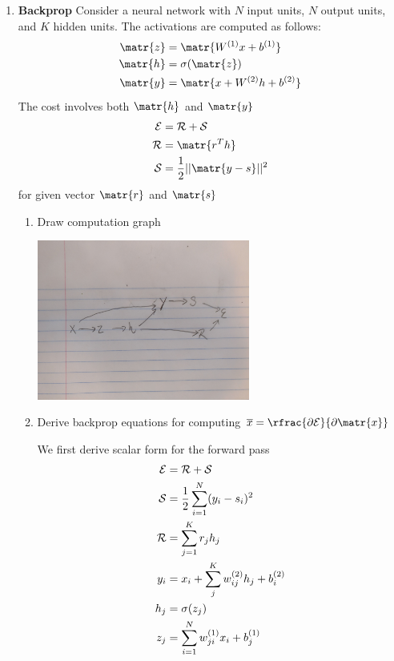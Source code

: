 \documentclass[11pt]{article}
\begin{document}
\begin{enumerate}
\item \textbf{Backprop} Consider a neural network with $N$ input units, $N$ output units, and $K$ hidden units. The activations are computed as follows: 
\begin{align*}
    \matr{z} &= \matr{W^{(1)}x + b^{(1)}} \\
    \matr{h} &= \sigma(\matr{z}) \\
    \matr{y} &= \matr{x + W^{(2)}h + b^{(2)}} \\ 
\end{align*}
The cost involves both $\matr{h}$ and $\matr{y}$ 
\begin{align*}
    \calE &= \calR + \calS \\
    \calR &= \matr{r^T h} \\
    \calS &= \frac{1}{2} ||\matr{y-s}||^2 \\ 
\end{align*}
for given vector $\matr{r}$ and $\matr{s}$
\begin{enumerate}
    \item Draw computation graph 
    \begin{center}
        \includegraphics[width=7cm]{computation_graph.jpg}
    \end{center}
    \item Derive backprop equations for computing $\overline{x} = \rfrac{\partial \calE}{\partial \matr{x}}$ 
    \begin{solution}
        We first derive scalar form for the forward pass 
        \begin{align*}
            \calE &= \calR + \calS \\ 
            \calS &= \frac{1}{2} \sum_{i=1}^N (y_i - s_i)^2 \\
            \calR &= \sum_{j=1}^K r_j h_j \\
            y_i   &= x_i + \sum_j^K w_{ij}^{(2)} h_j + b_i^{(2)} \\  
            h_j   &= \sigma(z_j) \\
            z_j   &= \sum_{i=1}^N w_{ji}^{(1)} x_i + b_j^{(1)} \\

\end{align*}
\end{solution}
\end{enumerate}
\end{enumerate}
\end{document}
